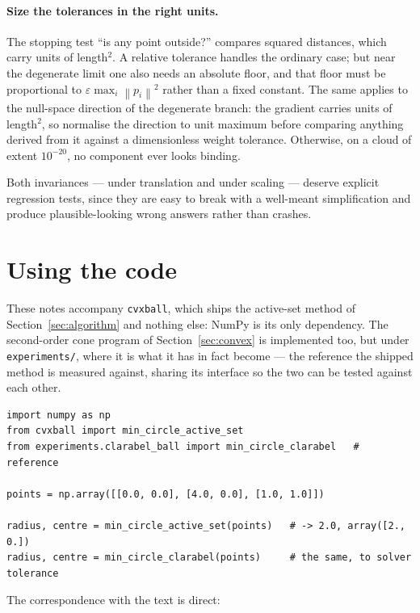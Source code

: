 \documentclass[11pt,a4paper]{article}
\theoremstyle{plain}
\theoremstyle{definition}
\theoremstyle{remark}
\newcommand{\norm}[1]{\left\lVert #1 \right\rVert}
\begin{document}
\paragraph{Size the tolerances in the right units.} The stopping test
``is any point outside?'' compares squared distances, which carry units of
length$^2$. A relative tolerance handles the ordinary case; but near the
degenerate limit one also needs an absolute floor, and that floor must be
proportional to $\varepsilon \max_i \norm{p_i}^2$ rather than a fixed constant. The
same applies to the null-space direction of the degenerate branch: the gradient
carries units of length$^2$, so normalise the direction to unit maximum before
comparing anything derived from it against a dimensionless weight tolerance.
Otherwise, on a cloud of extent $10^{-20}$, no component ever looks binding.

Both invariances --- under translation and under scaling --- deserve explicit
regression tests, since they are easy to break with a well-meant simplification
and produce plausible-looking wrong answers rather than crashes.

\section{Using the code}
\label{sec:code}

These notes accompany \texttt{cvxball}, which ships the active-set method of
Section~\ref{sec:algorithm} and nothing else: NumPy is its only dependency. The
second-order cone program of Section~\ref{sec:convex} is implemented too, but
under \texttt{experiments/}, where it is what it has in fact become --- the
reference the shipped method is measured against, sharing its interface so the
two can be tested against each other.

\begin{lstlisting}
import numpy as np
from cvxball import min_circle_active_set
from experiments.clarabel_ball import min_circle_clarabel   # reference

points = np.array([[0.0, 0.0], [4.0, 0.0], [1.0, 1.0]])

radius, centre = min_circle_active_set(points)   # -> 2.0, array([2., 0.])
radius, centre = min_circle_clarabel(points)     # the same, to solver tolerance
\end{lstlisting}

The correspondence with the text is direct:
\end{document}
